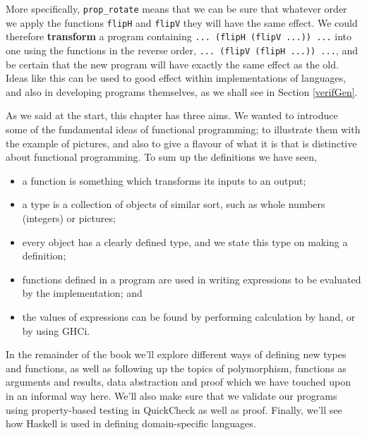 More specifically, \texttt{prop\_rotate} means that we can
be sure that whatever order we apply the functions \texttt{flipH} and 
\texttt{flipV} they will have the same effect. We could
therefore \textbf{transform} a program containing \texttt{...\ (flipH\ (flipV\ ...))\ ...}
into one using the functions in the reverse order,  \texttt{...\ (flipV\ (flipH\ ...))\ ...}, and be certain that the new
program will have exactly the same effect as the old. Ideas like this can be
used to good effect within implementations of languages, and also in
developing
programs themselves, as we shall see in Section \ref{verifGen}.



\begin{summary}
As we said at the start, this chapter has three aims. We wanted to
introduce some of the fundamental ideas of functional programming; to
illustrate them with the example of pictures, and also to give a flavour
of what it is that is distinctive about functional programming.
To sum up the definitions we have seen,
\begin{itemize}
\item a function is something which transforms its inputs
to an output;
\item a type is a collection of objects of similar sort, such as
 whole numbers (integers)  or pictures;
\item every object has a clearly defined type, and we state this type on
making a definition;
\item functions defined in a program are used in writing expressions to
be evaluated by the implementation; and
\item the values of expressions can be found by
performing calculation by hand, or by using GHCi.
\end{itemize}
In the remainder of the book we'll explore different ways of defining new types
and functions, as well as
following up the topics of polymorphism, functions as arguments and results, data
abstraction and proof which we have touched upon in an informal way
here.
We'll also make sure that we validate our programs using property-based testing in QuickCheck as well as proof. Finally, we'll see how Haskell is used in defining domain-specific languages.
\end{summary}
% 




